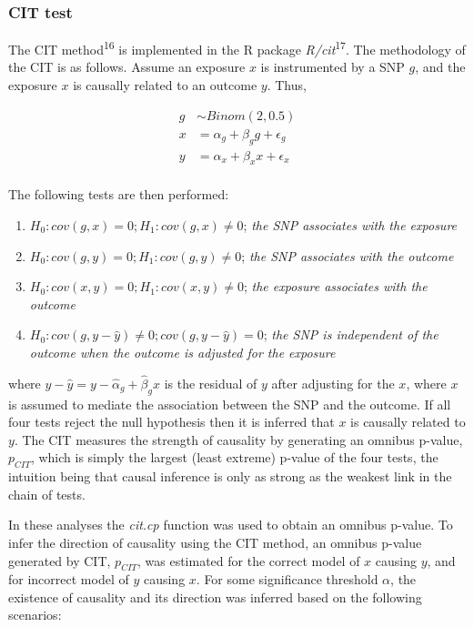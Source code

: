 \documentclass[]{article}
\providecommand{\tightlist}{%
  \setlength{\itemsep}{0pt}\setlength{\parskip}{0pt}}
\begin{document}
\subsubsection{CIT test}\label{cit-test}

The CIT method\textsuperscript{16} is implemented in the R package
\emph{R/cit}\textsuperscript{17}. The methodology of the CIT is as
follows. Assume an exposure \(x\) is instrumented by a SNP \(g\), and
the exposure \(x\) is causally related to an outcome \(y\). Thus,

\[
\begin{aligned}
g & \sim Binom(2, 0.5) \\
x & = \alpha_g + \beta_g g + \epsilon_g \\
y & = \alpha_x + \beta_x x + \epsilon_x \\
\end{aligned}
\]

The following tests are then performed:

\begin{enumerate}
\def\labelenumi{\arabic{enumi}.}
\tightlist
\item
  \(H_0: cov(g, x) = 0; H_1: cov(g, x) \neq 0\); \emph{the SNP
  associates with the exposure}
\item
  \(H_0: cov(g, y) = 0; H_1: cov(g, y) \neq 0\); \emph{the SNP
  associates with the outcome}
\item
  \(H_0: cov(x, y) = 0; H_1: cov(x, y) \neq 0\); \emph{the exposure
  associates with the outcome}
\item
  \(H_0: cov(g, y - \hat{y}) \neq 0; cov(g, y - \hat{y}) = 0\);
  \emph{the SNP is independent of the outcome when the outcome is
  adjusted for the exposure}
\end{enumerate}

where \(y - \hat{y} = y - \hat{\alpha}_g + \hat{\beta}_g x\) is the
residual of \(y\) after adjusting for the \(x\), where \(x\) is assumed
to mediate the association between the SNP and the outcome. If all four
tests reject the null hypothesis then it is inferred that \(x\) is
causally related to \(y\). The CIT measures the strength of causality by
generating an omnibus p-value, \(p_{CIT}\), which is simply the largest
(least extreme) p-value of the four tests, the intuition being that
causal inference is only as strong as the weakest link in the chain of
tests.

In these analyses the \emph{cit.cp} function was used to obtain an
omnibus p-value. To infer the direction of causality using the CIT
method, an omnibus p-value generated by CIT, \(p_{CIT}\), was estimated
for the correct model of \(x\) causing \(y\), and for incorrect model of
\(y\) causing \(x\). For some significance threshold \(\alpha\), the
existence of causality and its direction was inferred based on the
following scenarios:
\end{document}
